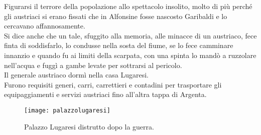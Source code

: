 \indent Figurarsi il terrore della popolazione allo spettacolo insolito, molto di più perché gli austriaci si erano fissati che in Alfonsine fosse nascosto Garibaldi e lo cercavano affannosamente. \\
\indent Si dice anche che un tale, sfuggito alla memoria, alle minacce di un austriaco, fece finta di soddisfarlo, lo condusse nella sosta del fiume, se lo fece camminare innanzio e quando fu ai limiti della scarpata, con una spinta lo mandò a ruzzolare nell'acqua e fuggì a gambe levate per sottrarsi al pericolo.\\
\indent Il generale austriaco dormì nella casa Lugaresi.\\
\indent Furono requisiti generi, carri, carrettieri e contadini per trasportare gli equipaggiamenti e servizi austriaci fino all'altra tappa di Argenta.

 \begin{figure}[htb]
    \centering
    \texttt{[image: palazzolugaresi]}
    \caption{Palazzo Lugaresi distrutto dopo la guerra.\label{fig:palazzolugaresi}}
\end{figure}
